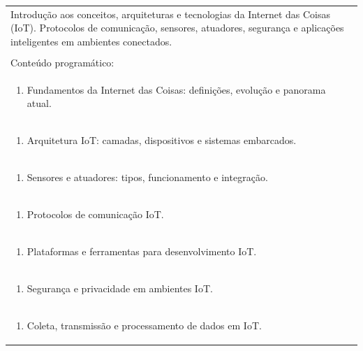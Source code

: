 \documentclass[11pt]{article}
\begin{document}
\begin{center}
\begin{longtable}{|p{4cm}|p{4cm}|p{4cm}|p{4cm}|}
\multicolumn{4}{|p{\dimexpr 16cm + 6\tabcolsep\relax}|}{Introdução aos conceitos, arquiteturas e tecnologias da Internet das Coisas (IoT). Protocolos de comunicação, sensores, atuadores, segurança e aplicações inteligentes em ambientes conectados.}\\
\multicolumn{4}{|p{16cm}|}{}\\
\hline
\multicolumn{4}{|p{16cm}|}{Conteúdo programático:}\\*
\multicolumn{4}{|p{\dimexpr 16cm + 6\tabcolsep\relax}|}{\begin{enumerate}[start=1]\item Fundamentos da Internet das Coisas: definições, evolução e panorama atual.\end{enumerate}}\\
\multicolumn{4}{|p{\dimexpr 16cm + 6\tabcolsep\relax}|}{\begin{enumerate}[start=2]\item Arquitetura IoT: camadas, dispositivos e sistemas embarcados.\end{enumerate}}\\
\multicolumn{4}{|p{\dimexpr 16cm + 6\tabcolsep\relax}|}{\begin{enumerate}[start=3]\item Sensores e atuadores: tipos, funcionamento e integração.\end{enumerate}}\\
\multicolumn{4}{|p{\dimexpr 16cm + 6\tabcolsep\relax}|}{\begin{enumerate}[start=4]\item Protocolos de comunicação IoT.\end{enumerate}}\\
\multicolumn{4}{|p{\dimexpr 16cm + 6\tabcolsep\relax}|}{\begin{enumerate}[start=5]\item Plataformas e ferramentas para desenvolvimento IoT.\end{enumerate}}\\
\multicolumn{4}{|p{\dimexpr 16cm + 6\tabcolsep\relax}|}{\begin{enumerate}[start=6]\item Segurança e privacidade em ambientes IoT.\end{enumerate}}\\
\multicolumn{4}{|p{\dimexpr 16cm + 6\tabcolsep\relax}|}{\begin{enumerate}[start=7]\item Coleta, transmissão e processamento de dados em IoT.\end{enumerate}}\\

\end{longtable}
\end{center}
\end{document}
